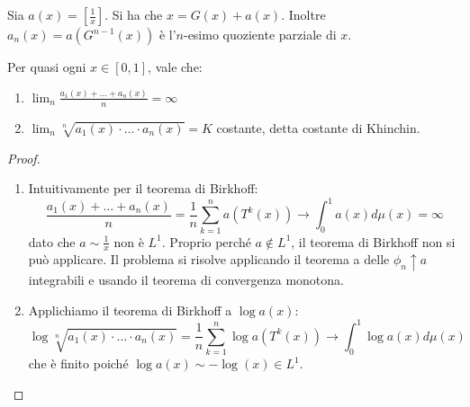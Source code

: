 Sia $a(x)=\left[\frac{1}{x}\right]$. Si ha che $x=G(x)+a(x)$. Inoltre $a_n(x)=a(G^{n-1}(x))$ \`e l'$n$-esimo quoziente parziale di $x$.

\begin{prop} Per quasi ogni $x\in [0,1]$, vale che: \begin{enumerate}
\item $\displaystyle\lim_n \frac{a_1(x)+\dots+a_n(x)}{n}=\infty$
\item $\displaystyle\lim_n \sqrt[n]{a_1(x)\cdot\dots\cdot a_n(x)}=K$ costante, detta costante di Khinchin.
\end{enumerate}
\end{prop}

\begin{proof}\leavevmode\begin{enumerate}
\item Intuitivamente per il teorema di Birkhoff:
$$\frac{a_1(x)+\dots+a_n(x)}{n}=\frac{1}{n}\sum_{k=1}^n a(T^k(x))\longrightarrow \int_0^1 a(x) d\mu(x)=\infty$$
dato che $a\sim \frac{1}{x}$ non \`e $L^1$. Proprio perch\'e $a\not\in L^1$, il teorema di Birkhoff non si pu\`o applicare. Il problema si risolve applicando il teorema a delle $\phi_n\uparrow a$ integrabili e usando il teorema di convergenza monotona.
\item Applichiamo il teorema di Birkhoff a $\log a(x)$:
$$\log \sqrt[n]{a_1(x)\cdot\dots\cdot a_n(x)}=\frac{1}{n}\sum_{k=1}^n \log a(T^k(x))\to\int_0^1 \log a(x) d\mu(x)$$
che \`e finito poich\'e $\log a(x) \sim -\log(x)\in L^1$.

\end{enumerate}
\end{proof}
